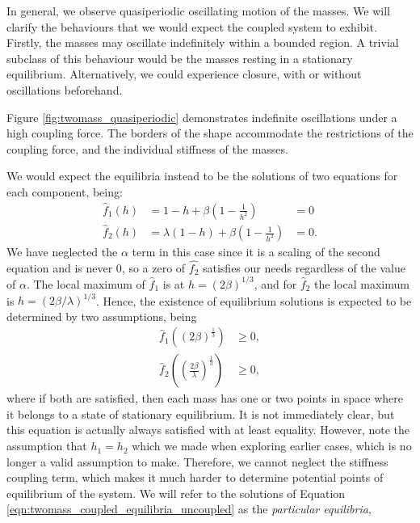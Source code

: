 \documentclass{report}
\begin{document}
In general, we observe quasiperiodic oscillating motion of the masses.
We will clarify the behaviours that we would expect the coupled system to exhibit.
Firstly, the masses may oscillate indefinitely within a bounded region.
A trivial subclass of this behaviour would be the masses resting in a stationary equilibrium.
Alternatively, we could experience closure, with or without oscillations beforehand.

Figure \ref{fig:twomass_quasiperiodic} demonstrates indefinite oscillations under a high coupling force. 
The borders of the shape accommodate the restrictions of the coupling force,
and the individual stiffness of the masses.

We would expect the equilibria instead to be the solutions of two equations for each component, being:
\begin{equation}
    \begin{aligned}
        \hat{f}_1(h) &= 1 - h + \beta\left( 1-\frac{1}{h^2} \right) &= 0 \\
        \hat{f}_2(h) &= \lambda(1-h) + \beta\left( 1-\frac{1}{h^2} \right) &= 0.
    \end{aligned}
    \label{eqn:twomass_coupled_equilibria_uncoupled}
\end{equation}
We have neglected the \(\alpha\) term in this case since it is a scaling of the second equation and is never $0$,
so a zero of \(\hat{f_2}\) satisfies our needs regardless of the value of \(\alpha\).
The local maximum of $\hat{f}_1$ is at $h=(2\beta)^{1/3}$,
and for $\hat{f}_2$ the local maximum is $h = (2 \beta / \lambda)^{1/3}$.
Hence, the existence of equilibrium solutions is expected to be determined by two assumptions, being
\begin{align*}
    \hat{f}_1 \left( (2\beta)^\frac{1}{3} \right) &\ge 0, \\
    \hat{f}_2 \left( \left( \frac{2\beta}{\lambda} \right)^\frac{1}{3} \right) &\ge 0,
\end{align*}
where if both are satisfied, then each mass has one or two points in space where it belongs to a state of stationary equilibrium.
It is not immediately clear, but this equation is actually always satisfied with at least equality.
However, note the assumption that \(h_1=h_2\) which we made when exploring earlier cases,
which is no longer a valid assumption to make. 
Therefore, we cannot neglect the stiffness coupling term,
which makes it much harder to determine potential points of equilibrium of the system.
We will refer to the solutions of Equation \ref{eqn:twomass_coupled_equilibria_uncoupled} as the \textit{particular equilibria},
\end{document}
